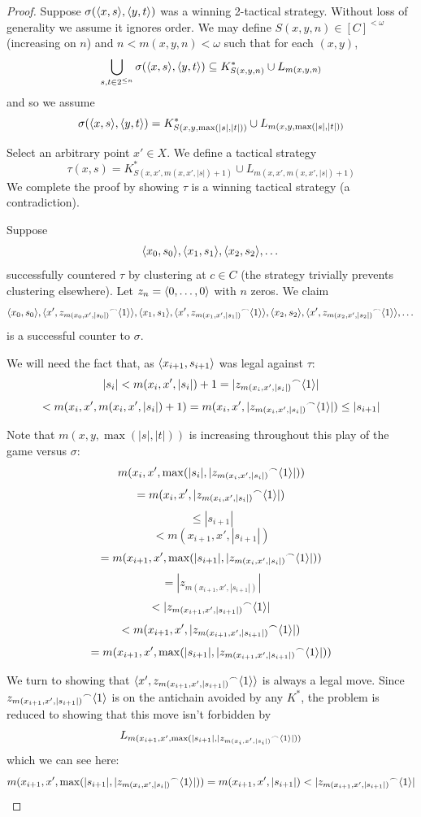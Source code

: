 \begin{proof}
Suppose $\sigma(\langle x,s\rangle,\langle y,t\rangle)$ was a winning 2-tactical strategy. Without loss of generality we assume it ignores order. We may define $S(x,y,n)\in [C]^{<\omega}$ (increasing on $n$) and $n<m(x,y,n)<\omega$ such that for each $(x,y)$,
  \[
    \bigcup_{s,t \in 2^{\leq n}} \sigma(\langle x,s\rangle,\langle y,t\rangle) \subseteq 
    K^*_{S(x,y,n)} \cup L_{m(x,y,n)}
  \]
and so we assume
  \[
    \sigma(\langle x,s\rangle,\langle y,t\rangle) =
    K^*_{S(x,y,\max(|s|,|t|))} \cup L_{m(x,y,\max(|s|,|t|))}
  \]

Select an arbitrary point $x' \in X$. We define a tactical strategy 
  \[
  \tau(x,s) = 
  K^*_{S(x,x',m(x,x',|s|)+1)} \cup L_{m(x,x',m(x,x',|s|)+1)}
  \]
We complete the proof by showing $\tau$ is a winning tactical strategy (a contradiction).

Suppose
\[
\langle x_0, s_0\rangle, \langle x_1, s_1\rangle, \langle x_2, s_2\rangle, \dots
\]
successfully countered $\tau$ by clustering at $c\in C$ (the strategy trivially prevents clustering elsewhere). Let $z_n = \langle0,\dots,0\rangle$ with $n$ zeros. We claim
\[
\langle x_0, s_0\rangle, \langle x', {z_{m(x_0,x',|s_0|)}}^\frown\langle1\rangle\rangle, \langle x_1, s_1\rangle, \langle x', {z_{m(x_1,x',|s_1|)}}^\frown\langle1\rangle\rangle,  \langle x_2, s_2\rangle, \langle x', {z_{m(x_2,x',|s_2|)}}^\frown\langle1\rangle\rangle, \dots
\]
is a successful counter to $\sigma$.

We will need the fact that, as $\langle x_{i+1},s_{i+1}\rangle$ was legal against $\tau$:
  \[
    |s_i| <
    m(x_i,x',|s_i|)+1 =
    |{z_{m(x_i,x',|s_i|)}}^\frown\langle1\rangle| 
  \]
  \[
    <
    m(x_i,x',m(x_i,x',|s_i|)+1) =
    m(x_i,x',|{z_{m(x_i,x',|s_i|)}}^\frown\langle1\rangle|) \leq
    |s_{i+1}|
  \]

Note that $m(x,y,\max(|s|,|t|))$ is increasing throughout this play of the game versus $\sigma$:
  \[
    m(x_i,x',\max(|s_i|,|{z_{m(x_i,x',|s_i|)}}^\frown\langle1\rangle|))
  \]
  \[
    =
    m(x_i,x',|{z_{m(x_i,x',|s_i|)}}^\frown\langle1\rangle|)
  \]
  \[
    \leq
    |s_{i+1}| 
  \]
  \[
    <
    m(x_{i+1},x',|s_{i+1}|)
  \]
  \[
    =
    m(x_{i+1},x',\max(|s_{i+1}|,|{z_{m(x_i,x',|s_i|)}}^\frown\langle1\rangle|))
  \]
  \[
    =
    |{z_{m(x_{i+1},x',|s_{i+1}|)}}|
  \]
  \[
    <
    |{z_{m(x_{i+1},x',|s_{i+1}|)}}^\frown\langle1\rangle|
  \]
  \[
    <
    m(x_{i+1},x',|{z_{m(x_{i+1},x',|s_{i+1}|)}}^\frown\langle1\rangle|)
  \]
  \[
    =
    m(x_{i+1},x',\max(|s_{i+1}|,|{z_{m(x_{i+1},x',|s_{i+1}|)}}^\frown\langle1\rangle|))
  \]

We turn to showing that $\langle x', {z_{m(x_{i+1},x',|s_{i+1}|)}}^\frown\langle1\rangle\rangle$ is always a legal move. Since ${z_{m(x_{i+1},x',|s_{i+1}|)}}^\frown\langle1\rangle$ is on the antichain avoided by any $K^*$, the problem is reduced to showing that this move isn't forbidden by
  \[
  L_{m(x_{i+1},x',\max(|s_{i+1}|,|{z_{m(x_i,x',|s_i|)}}^\frown\langle1\rangle|))}
  \]
which we can see here:
  \[
    m(x_{i+1},x',\max(|s_{i+1}|,|{z_{m(x_i,x',|s_i|)}}^\frown\langle1\rangle|)) =
    m(x_{i+1},x',|s_{i+1}|) <
    |{z_{m(x_{i+1},x',|s_{i+1}|)}}^\frown\langle1\rangle|
  \]


\end{proof}
